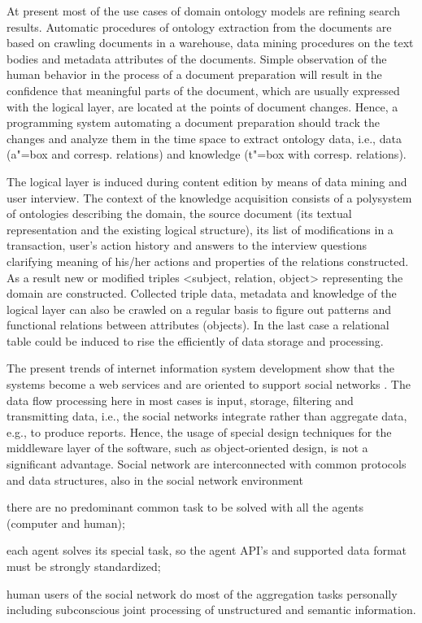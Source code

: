 \documentclass[conference]{IEEEtran}
\begin{document}
At present most of the use cases of domain ontology models are refining search results. Automatic procedures of ontology extraction from the documents are based on crawling documents in a warehouse, data mining procedures on the text bodies and metadata attributes of the documents. Simple observation of the human behavior in the process of a document preparation will result in the confidence that meaningful parts of the document, which are usually expressed with the logical layer, are located at the points of document changes. Hence, a programming system automating a document preparation should track the changes and analyze them in the time space to extract ontology data, i.e., data (a"=box and corresp. relations) and knowledge (t"=box with corresp. relations).

The logical layer is induced during content edition by means of data mining and user interview. The context of the knowledge acquisition consists of a polysystem of ontologies describing the domain, the source document (its textual representation and the existing logical structure), its list of modifications in a transaction, user's action history and answers to the interview questions clarifying meaning of his/her actions and properties of the relations constructed. As a result new or modified triples <subject, relation, object> representing the domain are constructed. Collected triple data, metadata and knowledge of the logical layer can also be crawled on a regular basis to figure out patterns and functional relations between attributes (objects). In the last case a relational table could be induced to rise the efficiently of data storage and processing.

The present trends of internet information system development show that the systems become a web services and are oriented to support social networks \cite{b3}. The data flow processing here in most cases is input, storage, filtering and transmitting data, i.e., the social networks integrate rather than aggregate data, e.g., to produce reports. Hence, the usage of special design techniques for the middleware layer of the software, such as object-oriented design, is not a significant advantage. Social network are interconnected with common protocols and data structures, also in the social network environment

\begin{IEEEitemize}[\IEEEsetlabelwidth{Z}]
\item there are no predominant common task to be solved with all the agents (computer and human);
\item each agent solves its special task, so the agent API’s and supported data format must be strongly standardized;
\item human users of the social network do most of the aggregation tasks personally including subconscious joint processing of unstructured and semantic information.
\end{IEEEitemize}
\end{document}
